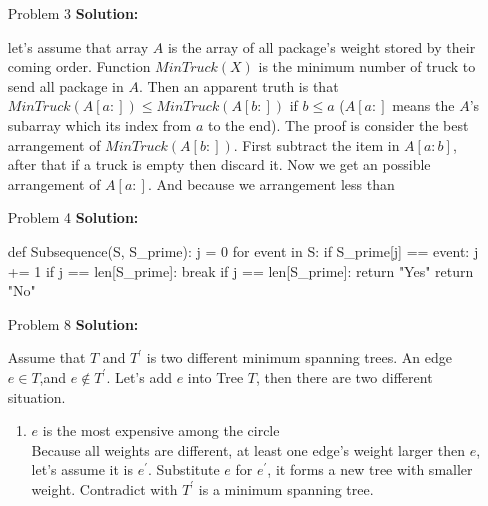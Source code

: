 \normalfont\documentclass[letterpaper,11pt]{article}
\begin{document}
\setlength{\parindent}{2ex}
\newcommand{\header}{
	\noindent {}
}
\bigskip
\header


	

\begin{enumerate}
\item [Problem 3]\textbf{Solution:}\par
let's assume that array $A$ is the array of all package's weight stored by their coming order. Function $MinTruck(X)$ is the minimum number of truck to send all package in $A$. Then an apparent truth is that $MinTruck(A[a:]) \le MinTruck(A[b:])$ if $b \le a$ ($A[a:]$ means the $A$'s subarray which its index from $a$ to the end). 
	The proof is consider the best arrangement of $MinTruck(A[b:])$. First subtract the item in $A[a:b]$, after that if a truck is empty then discard it. Now we get an possible arrangement of $A[a:]$. And because we  arrangement less than 
\item [Problem 4]\textbf{Solution:}\par
\begin{python}
def Subsequence(S, S_prime):
	j = 0
	for event in S:
		if S_prime[j] == event:
			j += 1
		if j == len[S_prime]:
			break
	if j == len[S_prime]:
		return "Yes"
	return "No"
\end{python}
\item [Problem 8]\textbf{Solution:}\par
Assume that $T$ and $T^\prime$ is two different minimum spanning trees. An edge $e \in T$,and $e\not\in T^\prime$. Let's add $e$ into Tree $T$, then there are two different situation.
\begin{enumerate}
	\item$e$ is the most expensive among the circle\\
		Because all weights are different, at least one edge's weight larger then $e$, let's assume it is $e^\prime$. Substitute $e$ for $e^\prime$, it forms a new tree with smaller weight. Contradict with $T^\prime$ is a minimum spanning tree.

\end{enumerate}
\end{enumerate}
\end{document}
